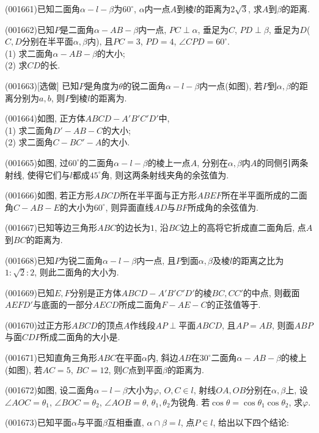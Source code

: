 \item (001661)已知二面角$\alpha-l-\beta$为$60^\circ$, $\alpha$内一点$A$到棱$l$的距离为$2\sqrt{3}$, 求$A$到$\beta$的距离.
\item (001662)已知$P$是二面角$\alpha-AB-\beta$内一点, $PC\perp\alpha$,
垂足为$C$, $PD\perp\beta$, 垂足为$D$($C,D$分别在半平面$\alpha,\beta$内), 且$PC=3$, $PD=4$, $\angle CPD=60^\circ$.\\ 
(1) 求二面角$\alpha-AB-\beta$的大小;\\ 
(2) 求$CD$的长.
\item (001663)[选做]
已知$P$是角度为$\theta$的锐二面角$\alpha-l-\beta$内一点(如图), 若$P$到$\alpha,\beta$的距离分别为$a,b$, 则$P$到棱$l$的距离为.
\item (001664)如图, 正方体$ABCD-A'B'C'D'$中,\\ 
(1) 求二面角$D'-AB-C$的大小;\\ 
(2) 求二面角$C-BC'-A$的大小.
\item (001665)如图, 过$60^\circ$的二面角$\alpha-l-\beta$的棱上一点$A$, 分别在$\alpha,\beta$内$A$的同侧引两条射线, 使得它们与$l$都成$45^\circ$角, 则这两条射线夹角的余弦值为.
\item (001666)如图, 若正方形$ABCD$所在半平面与正方形$ABEF$所在半平面所成的二面角$C-AB-E$的大小为$60^\circ$, 则异面直线$AD$与$BF$所成角的余弦值为.
\item (001667)已知等边三角形$ABC$的边长为$1$, 沿$BC$边上的高将它折成直二面角后, 点$A$到$BC$的距离为.
\item (001668)已知$P$为锐二面角$\alpha-l-\beta$内一点, 且$P$到面$\alpha,\beta$及棱$l$的距离之比为$1:\sqrt{2}:2$, 则此二面角的大小为.
\item (001669)已知$E,F$分别是正方体$ABCD-A'B'C'D'$的棱$BC,CC'$的中点, 则截面$AEFD'$与底面的一部分$AECD$所成二面角$F-AE-C$的正弦值等于.
\item (001670)过正方形$ABCD$的顶点$A$作线段$AP\perp$平面$ABCD$, 且$AP=AB$, 则面$ABP$与面$CDP$所成二面角的大小是.
\item (001671)已知直角三角形$ABC$在平面$\alpha$内, 斜边$AB$在$30^\circ$二面角$\alpha-AB-\beta$的棱上(如图), 若$AC=5$, $BC=12$, 则$C$点到平面$\beta$的距离为.
\item (001672)如图, 设二面角$\alpha-l-\beta$大小为$\varphi$, $O,C\in l$, 射线$OA,OB$分别在$\alpha,\beta$上,
设$\angle AOC=\theta_1$, $\angle BOC=\theta_2$, $\angle AOB=\theta$, $\theta_1,\theta_2$为锐角.
若$\cos\theta=\cos\theta_1\cos\theta_2$, 求$\varphi$.
\item (001673)已知平面$\alpha$与平面$\beta$互相垂直, $\alpha\cap \beta=l$, 点$P\in l$, 给出以下四个结论:\\ 

